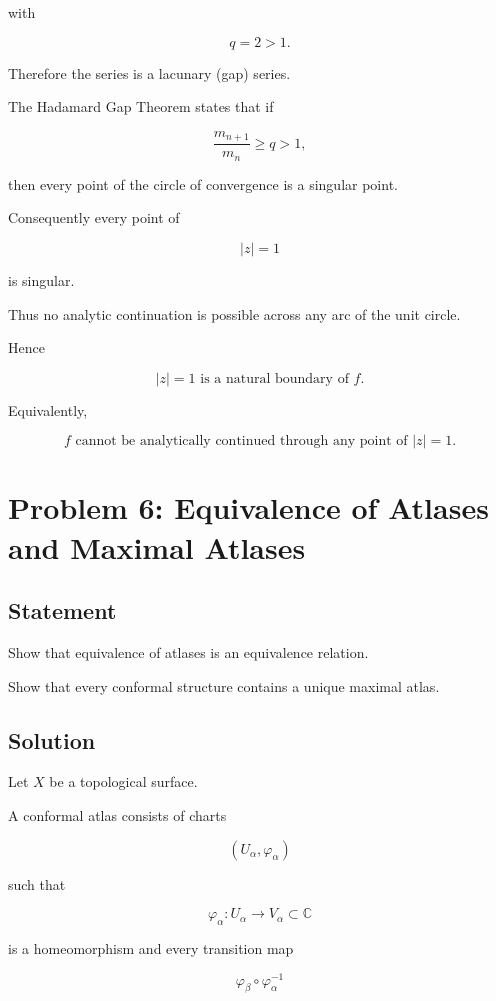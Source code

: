 \documentclass[12pt,a4paper]{article}
\theoremstyle{notespace}
\begin{document}
with

\[
q=2>1.
\]

Therefore the series is a lacunary (gap) series.

The Hadamard Gap Theorem states that if

\[
\frac{m_{n+1}}{m_n}\ge q>1,
\]

then every point of the circle of convergence is a singular point.

Consequently every point of

\[
|z|=1
\]

is singular.

Thus no analytic continuation is possible across any arc of the unit circle.

Hence

\[
\boxed{
	|z|=1
	\text{ is a natural boundary of }
	f.
}
\]

Equivalently,

\[
\boxed{
	f
	\text{ cannot be analytically continued through any point of }
	|z|=1.
}
\]

\bigskip

\section{Problem 6: Equivalence of Atlases and Maximal Atlases}

\subsection*{Statement}

Show that equivalence of atlases is an equivalence relation.

Show that every conformal structure contains a unique maximal atlas.

\subsection*{Solution}

Let \(X\) be a topological surface.

A conformal atlas consists of charts

\[
(U_\alpha,\varphi_\alpha)
\]

such that

\[
\varphi_\alpha:
U_\alpha
\to
V_\alpha\subset\mathbb C
\]

is a homeomorphism and every transition map

\[
\varphi_\beta\circ\varphi_\alpha^{-1}
\]
\end{document}
